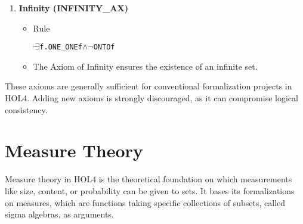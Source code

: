 \begin{enumerate}
    \item \textbf{Infinity (INFINITY\_AX)}
    \begin{itemize}
        \item Rule
          \begin{alltt}
            \(\!\!\!{\turn}\!\!\!\!\) \(\exists\)f. ONE_ONE f \(\land\) \(\neg\)ONTO f
          \end{alltt}
        \item The Axiom of Infinity ensures the existence of an infinite set.
    \end{itemize}

\end{enumerate}

These axioms are generally sufficient for conventional formalization projects in HOL4. Adding new axioms is strongly discouraged, as it can compromise logical consistency.


\section{Measure Theory}

Measure theory in HOL4 is the theoretical foundation on which measurements like size, content, or probability can be given to sets. It bases its formalizations on measures, which are functions taking specific collections of subsets, called sigma algebras, as arguments.


